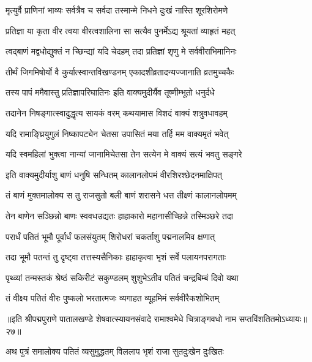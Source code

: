 \twolineshloka
{मृत्युर्वै प्राणिनां भाव्यः सर्वत्रैव च सर्वदा}
{तस्मान्मे निधने दुःखं नास्ति शूरशिरोमणे}%

\twolineshloka
{प्रतिज्ञा या कृता वीर त्वया वीरत्वशालिना}
{सा सत्यैव पुनर्मेऽद्य श्रूयतां व्याहृतं महत्}%

\twolineshloka
{त्वद्बाणं मद्वधोद्युक्तं न च्छिन्द्यां यदि चेदहम्}
{तदा प्रतिज्ञां शृणु मे सर्ववीराभिमानिनः}%

\twolineshloka
{तीर्थं जिगमिषोर्यो वै कुर्यात्स्वान्तविखण्डनम्}
{एकादशीव्रतादन्यज्जानाति व्रतमुच्चकैः}%

\twolineshloka
{तस्य पापं ममैवास्तु प्रतिज्ञापरिघातिनः}
{इति वाक्यमुदीर्यैव तूष्णीम्भूतो धनुर्दधे}%

\twolineshloka
{तदानेन निषङ्गात्स्वादुद्धृत्य सायकं वरम्}
{कथयामास विशदं वाक्यं शत्रुवधावहम्}%


\twolineshloka
{यदि रामाङ्घ्रियुगुलं निष्कापट्येन चेतसा}
{उपासितं मया तर्हि मम वाक्यमृतं भवेत्}%

\twolineshloka
{यदि स्वमहिलां भुक्त्वा नान्यां जानामिचेतसा}
{तेन सत्येन मे वाक्यं सत्यं भवतु सङ्गरे}%

\twolineshloka
{इति वाक्यमुदीर्याशु बाणं धनुषि सन्धितम्}
{कालानलोपमं वीरशिरश्छेदनमाक्षिपत्}%

\twolineshloka
{तं बाणं मुक्तमालोक्य स तु राजसुतो बली}
{बाणं शरासने धत्त तीक्ष्णं कालानलोपमम्}%

\twolineshloka
{तेन बाणेन सञ्छिन्नो बाणः स्ववधउद्यतः}
{हाहाकारो महानासीच्छिन्ने तस्मिञ्छरे तदा}%

\twolineshloka
{परार्धं पतितं भूमौ पूर्वार्धं फलसंयुतम्}
{शिरोधरां चकर्ताशु पद्मनालमिव क्षणात्}%

\twolineshloka
{तदा भूमौ पतन्तं तु दृष्ट्वा तत्तस्यसैनिकाः}
{हाहाकृत्वा भृशं सर्वे पलायनपरागताः}%

\twolineshloka
{पृथ्व्यां तन्मस्तकं श्रेष्ठं सकिरीटं सकुण्डलम्}
{शुशुभेऽतीव पतितं चन्द्रबिम्बं दिवो यथा}%

\twolineshloka
{तं वीक्ष्य पतितं वीरः पुष्कलो भरतात्मजः}
{व्यगाहत व्यूहमिमं सर्ववीरैकशोभितम्}%

{॥इति श्रीपद्मपुराणे पातालखण्डे शेषवात्स्यायनसंवादे रामाश्वमेधे चित्राङ्गवधो नाम सप्तविंशतितमोऽध्यायः॥२७॥}



\twolineshloka
{अथ पुत्रं समालोक्य पतितं व्यसुमुद्धतम्}
{विललाप भृशं राजा सुतदुःखेन दुःखितः}%

